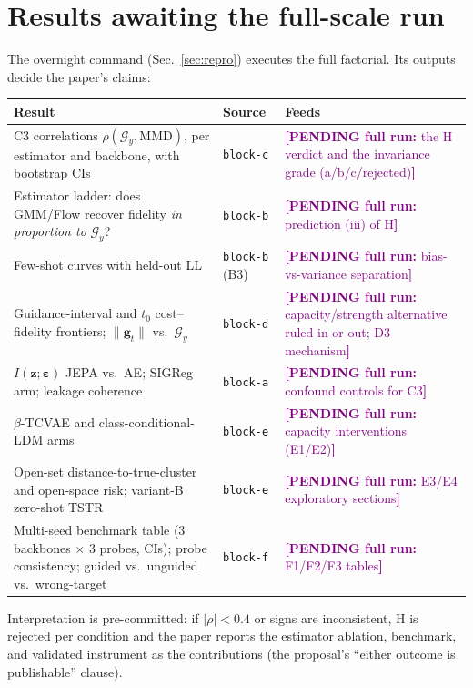 \documentclass[11pt]{article}
\newcommand{\z}{\mathbf{z}}
\newcommand{\Gng}{\mathcal{G}}
\newcommand{\pending}[1]{\textcolor{purple}{\textbf{[PENDING full run:} #1\textbf{]}}}
\newcommand{\code}[1]{\texttt{\small #1}}
\begin{document}
\section{Results awaiting the full-scale run}
\label{sec:pending}

The overnight command (Sec.~\ref{sec:repro}) executes the full factorial.
Its outputs decide the paper's claims:

\begin{center}\small
\begin{tabular}{p{}p{}p{}}
\toprule
Result & Source & Feeds\\
\midrule
C3 correlations $\rho(\Gng_y,\mathrm{MMD})$, per estimator and backbone,
with bootstrap CIs & \code{block-c} & \pending{the H verdict and the
invariance grade (a/b/c/rejected)}\\
Estimator ladder: does GMM/Flow recover fidelity \emph{in proportion to}
$\Gng_y$? & \code{block-b} & \pending{prediction (iii) of H}\\
Few-shot curves with held-out LL & \code{block-b} (B3) & \pending{bias-vs-variance
separation}\\
Guidance-interval and $t_0$ cost--fidelity frontiers; $\|\mathbf{g}_t\|$
vs.\ $\Gng_y$ & \code{block-d} & \pending{capacity/strength alternative
ruled in or out; D3 mechanism}\\
$I(\z;\boldsymbol{\varepsilon})$ JEPA vs.\ AE; SIGReg arm; leakage
coherence & \code{block-a} & \pending{confound controls for C3}\\
$\beta$-TCVAE and class-conditional-LDM arms & \code{block-e} & \pending{capacity
interventions (E1/E2)}\\
Open-set distance-to-true-cluster and open-space risk; variant-B zero-shot
TSTR & \code{block-e} & \pending{E3/E4 exploratory sections}\\
Multi-seed benchmark table (3 backbones $\times$ 3 probes, CIs); probe
consistency; guided vs.\ unguided vs.\ wrong-target & \code{block-f} &
\pending{F1/F2/F3 tables}\\
\bottomrule
\end{tabular}
\end{center}

Interpretation is pre-committed: if $|\rho|<0.4$ or signs are inconsistent,
H is rejected per condition and the paper reports the estimator ablation,
benchmark, and validated instrument as the contributions (the proposal's
``either outcome is publishable'' clause).
\end{document}
